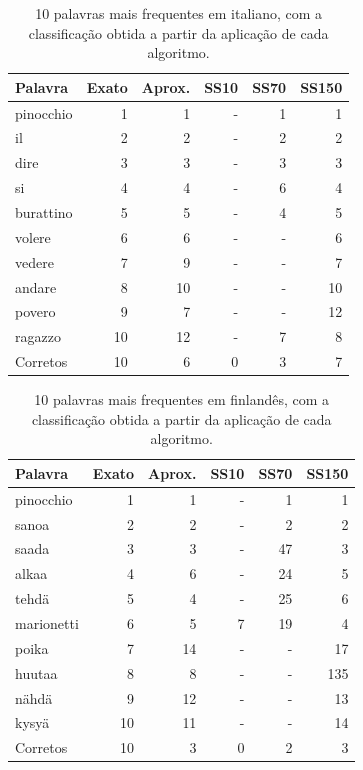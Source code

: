 \documentclass[mirror, portugues]{revdetua}
\begin{document}
\begin{table}[H]
\centering
\caption{10 palavras mais frequentes em italiano, com a classificação obtida a partir da aplicação de cada algoritmo.}
\label{table:rank10_it}
\begin{tabular}{lrrrrr}
\toprule
Palavra & Exato & Aprox. & SS10 & SS70 & SS150 \\
\midrule
pinocchio & 1 & 1 & - & 1 & 1 \\
il & 2 & 2 & - & 2 & 2 \\
dire & 3 & 3 & - & 3 & 3 \\
si & 4 & 4 & - & 6 & 4 \\
burattino & 5 & 5 & - & 4 & 5 \\
volere & 6 & 6 & - & - & 6 \\
vedere & 7 & 9 & - & - & 7 \\
andare & 8 & 10 & - & - & 10 \\
povero & 9 & 7 & - & - & 12 \\
ragazzo & 10 & 12 & - & 7 & 8 \\
\midrule
Corretos & 10 & 6 & 0 & 3 & 7 \\
\bottomrule
\end{tabular}
\end{table}

\begin{table}[H]
\centering
\caption{10 palavras mais frequentes em finlandês, com a classificação obtida a partir da aplicação de cada algoritmo.}
\label{table:rank10_fi}
\begin{tabular}{lrrrrr}
\toprule
Palavra & Exato & Aprox. & SS10 & SS70 & SS150 \\
\midrule
pinocchio & 1 & 1 & - & 1 & 1 \\
sanoa & 2 & 2 & - & 2 & 2 \\
saada & 3 & 3 & - & 47 & 3 \\
alkaa & 4 & 6 & - & 24 & 5 \\
tehdä & 5 & 4 & - & 25 & 6 \\
marionetti & 6 & 5 & 7 & 19 & 4 \\
poika & 7 & 14 & - & - & 17 \\
huutaa & 8 & 8 & - & - & 135 \\
nähdä & 9 & 12 & - & - & 13 \\
kysyä & 10 & 11 & - & - & 14 \\
\midrule
Corretos & 10 & 3 & 0 & 2 & 3 \\
\bottomrule
\end{tabular}
\end{table}
\end{document}
